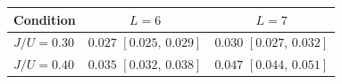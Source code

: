 \begin{tabular}{l cc}
\toprule
Condition & $L=6$ & $L=7$ \\
\midrule
$J/U=0.30$ & $0.027$ $[0.025,\,0.029]$ & $0.030$ $[0.027,\,0.032]$ \\
$J/U=0.40$ & $0.035$ $[0.032,\,0.038]$ & $0.047$ $[0.044,\,0.051]$ \\
\bottomrule
\end{tabular}